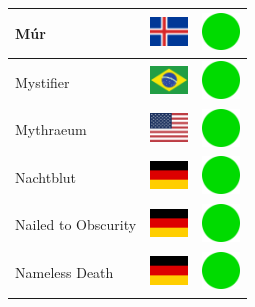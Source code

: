 \documentclass[12pt, a4paper, twoside]{report}
\begin{document}
\begin{center}
\begin{longtable}{|p{5cm}|p{2cm}|p{2cm}|}
 Múr                                                        & \includegraphics[width=1cm]{4x3/is} &   \includegraphics[width=1cm]{likes/y} \\ \hline
 Mystifier                                                  & \includegraphics[width=1cm]{4x3/br} &   \includegraphics[width=1cm]{likes/y} \\ \hline
 Mythraeum                                                  & \includegraphics[width=1cm]{4x3/us} &   \includegraphics[width=1cm]{likes/y} \\ \hline
 Nachtblut                                                  & \includegraphics[width=1cm]{4x3/de} &   \includegraphics[width=1cm]{likes/y} \\ \hline
 Nailed to Obscurity                                        & \includegraphics[width=1cm]{4x3/de} &   \includegraphics[width=1cm]{likes/y} \\ \hline
 Nameless Death                                             & \includegraphics[width=1cm]{4x3/de} &   \includegraphics[width=1cm]{likes/y} \\ \hline

\end{longtable}
\end{center}
\end{document}
